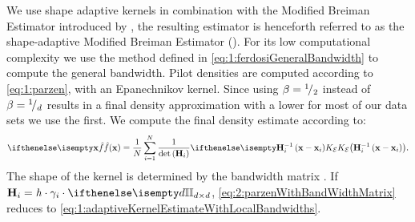 
	We use shape adaptive kernels in combination with the Modified Breiman Estimator introduced by \textcite{wilkinson1995dataplot}, the resulting estimator is henceforth referred to as the shape-adaptive Modified Breiman Estimator (\sambe). 
	For its low computational complexity we use the method defined in \cref{eq:1:ferdosiGeneralBandwidth} to compute the general bandwidth. 
	Pilot densities are computed according to \cref{eq:1:parzen}, with an Epanechnikov kernel.
	Since using $\beta = {}^{1}\!/_{2}$ instead of $\beta = {}^{1}\!/_{d}$ results in a final density approximation with a lower \mse for most of our data sets we use the first.
	We compute the final density estimate according to:
	\begin{equation}\label{eq:2:parzenWithBandWidthMatrix}
		\varEstimatedDensityFunction{\varPattern} = \frac{1}{\varNumPatterns}\sum_{\itXis = 1}^{\varNumPatterns} \frac{1}{\det\left(\varBandwidthMatrix[\itXis]\right)}\varKernel[\varEpan]{\varBandwidthMatrix[\itXis]^{-1}\left(\varPattern - \varPattern[\itXis]\right)}.
	\end{equation}
	The shape of the kernel \varKernel[\varEpan]{\bullet} is determined by the bandwidth matrix \varBandwidthMatrix[\itXis] \cite{hardle2012nonparametric}. If $\varBandwidthMatrix[\itXis] = \varBandwidth \cdot \varLocalBandwidth{\itXis} \cdot \identityMatrix{\varDim}$, \cref{eq:2:parzenWithBandWidthMatrix} reduces to \cref{eq:1:adaptiveKernelEstimateWithLocalBandwidths}.
	
